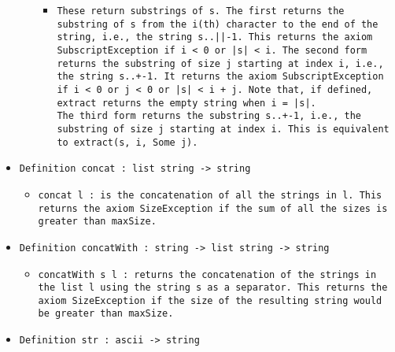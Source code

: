 \documentclass[11pt]{report}
\begin{document}
\begin{itemize}
\begin{itemize}
\begin{itemize}
\item  \begin{flushleft} \texttt{These return substrings of s. The first returns the substring of s from the i(th) character to the end of the string, i.e., the string s..||-1. This returns the axiom SubscriptException if i < 0 or |s| < i. The second form returns the substring of size j starting at index i, i.e., the string s..+-1. It returns the axiom SubscriptException if i < 0 or j < 0 or |s| < i + j. Note that, if defined, extract returns the empty string when i = |s|.\\
The third form returns the substring s..+-1, i.e., the substring of size j starting at index i. This is equivalent to extract(s, i, Some j).}\end{flushleft}

\end{itemize}

\end{itemize}

\item  \texttt{Definition concat : list string -> string}

\begin{itemize}
\item  \begin{flushleft} \texttt{concat l : is the concatenation of all the strings in l. This returns the axiom SizeException if the sum of all the sizes is greater than maxSize.} \end{flushleft}

\end{itemize}

\item  \texttt{Definition concatWith : string -> list string -> string}

\begin{itemize}
\item \begin{flushleft} \texttt{concatWith s l : returns the concatenation of the strings in the list l using the string s as a separator. This returns the axiom SizeException if the size of the resulting string would be greater than maxSize. } \end{flushleft}

\end{itemize}

\item  \texttt{Definition str : ascii -> string}


\end{itemize}
\end{document}
